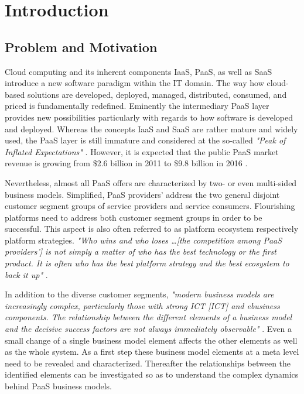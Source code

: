\chapter{Introduction}\label{ch:intro}

\section{Problem and Motivation}\label{ch:intro:mo}


Cloud computing and its inherent components \acf{IaaS}, \acf{PaaS}, as well as \acf{SaaS} introduce a new software paradigm within the \acf{IT} domain. The way how cloud-based solutions are developed, deployed, managed, distributed, consumed, and priced is fundamentally redefined. Eminently the intermediary \ac{PaaS} layer provides new possibilities particularly with regards to how software is developed and deployed. Whereas the concepts \ac{IaaS} and \ac{SaaS} are rather mature and widely used, the \ac{PaaS} layer is still immature and considered at the so-called \textit{"Peak of Inflated Expectations"} \citep[p. 5]{Smith2012}. However, it is expected that the public \ac{PaaS} market revenue is growing from \$2.6 billion in 2011 to \$9.8 billion in 2016 \citep[p. 22]{Hendrick2012a}.

Nevertheless, almost all \ac{PaaS} offers are characterized by two- or even multi-sided business models. Simplified, \ac{PaaS} providers' address the two general disjoint customer segment groups of service providers and service consumers. Flourishing platforms need to address both customer segment groups in order to be successful. This aspect is also often referred to as platform ecosystem respectively platform strategies. \textit{"Who wins and who loses \ldots [the competition among \ac{PaaS} providers'] is not simply a matter of who has the best technology or the first product. It is often who has the best platform strategy and the best ecosystem to back it up"} \citep[p. 34]{Cusumano2010}.

In addition to the diverse customer segments, \textit{"modern business models are increasingly complex, particularly those with strong ICT [\acl{ICT}] and ebusiness components. The relationship between the different elements of a business model and the decisive success factors are not always immediately observable"} \citep[p. 14]{Osterwalder2005}. Even a small change of a single business model element affects the other elements as well as the whole system. As a first step these business model elements at a meta level need to be revealed and characterized. Thereafter the relationships between the identified elements can be investigated so as to understand the complex dynamics behind \ac{PaaS} business models.


